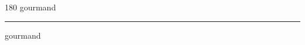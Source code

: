 
\begin{frame}
\begin{center}
\begin{turn}{180}
{\fontsize{2.5cm}{1em}\selectfont gourmand}
\end{turn}
\vspace{1em}\par  
\hrule
\vspace{1em}\par  
{\fontsize{2.5cm}{1em}\selectfont gourmand}
\end{center}
\end{frame}
